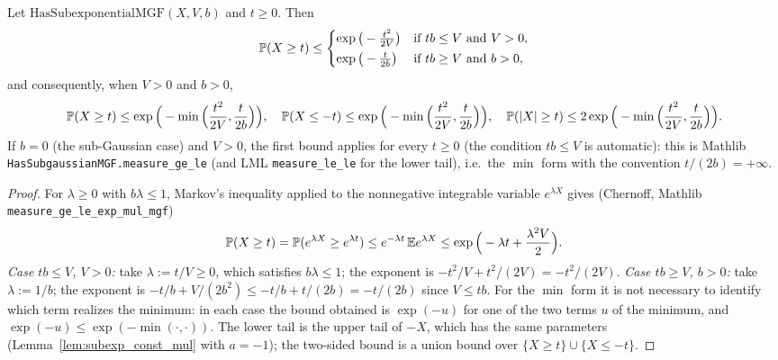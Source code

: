 \begin{lemma}\label{lem:subexp_tail}
\leanok
{}
Let $\mathrm{HasSubexponentialMGF}(X,V,b)$ and $t \ge 0$. Then
\[
  \mathbb{P}(X \ge t) \le
  \begin{cases}
    \exp\big(-\frac{t^2}{2V}\big) & \text{if } tb \le V \text{ and } V > 0,\\[2pt]
    \exp\big(-\frac{t}{2b}\big) & \text{if } tb \ge V \text{ and } b > 0 ,
  \end{cases}
\]
and consequently, when $V > 0$ and $b > 0$,
\[
  \mathbb{P}(X \ge t) \le \exp\Big(-\min\Big(\frac{t^2}{2V}, \frac{t}{2b}\Big)\Big), \quad
  \mathbb{P}(X \le -t) \le \exp\Big(-\min\Big(\frac{t^2}{2V}, \frac{t}{2b}\Big)\Big), \quad
  \mathbb{P}(\lvert X \rvert \ge t) \le 2\exp\Big(-\min\Big(\frac{t^2}{2V}, \frac{t}{2b}\Big)\Big).
\]
If $b = 0$ (the sub-Gaussian case) and $V > 0$, the first bound applies for every $t \ge 0$
(the condition $tb \le V$ is automatic): this is Mathlib
\texttt{HasSubgaussianMGF.measure\_ge\_le} (and LML \texttt{measure\_le\_le} for the lower tail),
i.e.\ the $\min$ form with the convention $t/(2b) = +\infty$.
\end{lemma}

\begin{proof}
\leanok
{}
For $\lambda \ge 0$ with $b\lambda \le 1$, Markov's inequality applied to the nonnegative
integrable variable $e^{\lambda X}$ gives (Chernoff, Mathlib
\texttt{measure\_ge\_le\_exp\_mul\_mgf})
\[
  \mathbb{P}(X \ge t) = \mathbb{P}(e^{\lambda X} \ge e^{\lambda t}) \le e^{-\lambda t}\,\mathbb{E} e^{\lambda X}
  \le \exp\Big(-\lambda t + \frac{\lambda^2V}{2}\Big).
\]
\emph{Case $tb \le V$, $V > 0$:} take $\lambda := t/V \ge 0$, which satisfies $b\lambda \le 1$;
the exponent is $-t^2/V + t^2/(2V) = -t^2/(2V)$. \emph{Case $tb \ge V$, $b > 0$:} take
$\lambda := 1/b$; the exponent is $-t/b + V/(2b^2) \le -t/b + t/(2b) = -t/(2b)$ since
$V \le tb$. For the $\min$ form it is not necessary to identify which term realizes the
minimum: in each case the bound obtained is $\exp(-u)$ for one of the two terms $u$ of the
minimum, and $\exp(-u) \le \exp(-\min(\cdot,\cdot))$. The lower tail is the upper tail of
$-X$, which has the same parameters (Lemma~\ref{lem:subexp_const_mul} with $a = -1$); the
two-sided bound is a union bound over $\{X \ge t\} \cup \{X \le -t\}$.
\end{proof}

